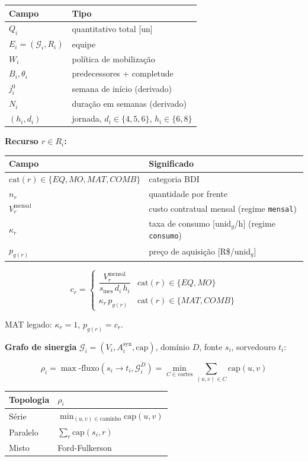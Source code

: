 \documentclass[
  10pt,
]{article}
\begin{document}
\begin{longtable}[]{@{}ll@{}}
\toprule\noalign{}
Campo & Tipo \\
\midrule\noalign{}
\endhead
\bottomrule\noalign{}
\endlastfoot
\(Q_i\) & quantitativo total {[}un{]} \\
\(E_i=(\mathcal{G}_i,R_i)\) & equipe \\
\(W_i\) & política de mobilização \\
\(B_i,\theta_i\) & predecessores + completude \\
\(j_i^0\) & semana de início (derivado) \\
\(N_i\) & duração em semanas (derivado) \\
\((h_i,d_i)\) & jornada, \(d_i\in\{4,5,6\}\), \(h_i\in\{6,8\}\) \\
\end{longtable}

\textbf{Recurso \(r\in R_i\):}

\begin{longtable}[]{@{}ll@{}}
\toprule\noalign{}
Campo & Significado \\
\midrule\noalign{}
\endhead
\bottomrule\noalign{}
\endlastfoot
\(\text{cat}(r)\in\{EQ,MO,MAT,COMB\}\) & categoria BDI \\
\(n_r\) & quantidade por frente \\
\(V_r^{\text{mensal}}\) & custo contratual mensal (regime
\texttt{mensal}) \\
\(\kappa_r\) & taxa de consumo {[}unid\(_g\)/h{]} (regime
\texttt{consumo}) \\
\(p_{g(r)}\) & preço de aquisição {[}R\$/unid\(_g\){]} \\
\end{longtable}

\[c_r = \begin{cases}\dfrac{V_r^{\text{mensal}}}{s_{\text{mes}}\,d_i\,h_i} & \text{cat}(r)\in\{EQ,MO\}\\[8pt]\kappa_r\,p_{g(r)} & \text{cat}(r)\in\{MAT,COMB\}\end{cases}\]

MAT legado: \(\kappa_r=1\), \(p_{g(r)}=c_r\).

\textbf{Grafo de sinergia}
\(\mathcal{G}_i=(V_i,A_i^{\text{syn}},\text{cap})\), domínio \(D\),
fonte \(s_i\), sorvedouro \(t_i\):

\[\boxed{\rho_i = \max\text{-fluxo}(s_i\to t_i,\mathcal{G}_i^D) = \min_{C\in\text{cortes}}\sum_{(u,v)\in C}\text{cap}(u,v)}\]

\begin{longtable}[]{@{}ll@{}}
\toprule\noalign{}
Topologia & \(\rho_i\) \\
\midrule\noalign{}
\endhead
\bottomrule\noalign{}
\endlastfoot
Série & \(\min_{(u,v)\in\text{caminho}}\text{cap}(u,v)\) \\
Paralelo & \(\sum_r\text{cap}(s_i,r)\) \\
Misto & Ford-Fulkerson \\
\end{longtable}
\end{document}
